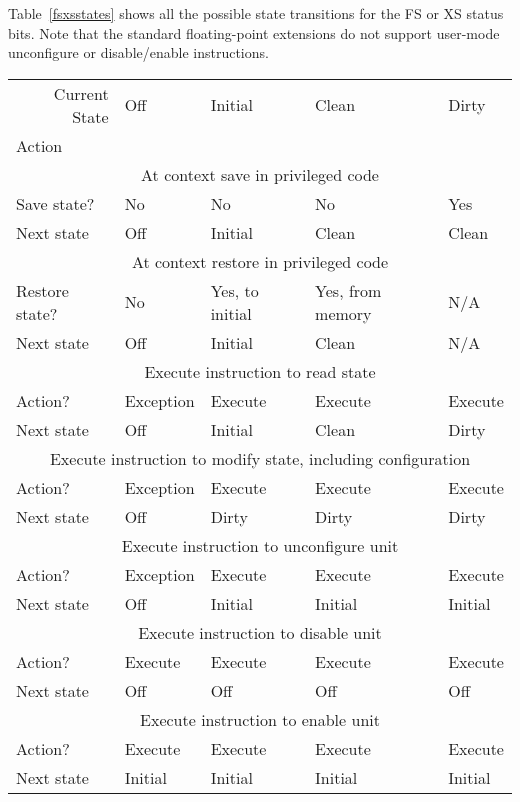 Table~\ref{fsxsstates} shows all the possible state transitions for
the FS or XS status bits.  Note that the standard floating-point
extensions do not support user-mode unconfigure or disable/enable
instructions.

\begin{table*}[h!]
\begin{center}
\begin{tabular}{|l|l|l|l|l|}
\hline
\multicolumn{1}{|r|}{Current State} & Off & Initial & Clean & Dirty \\
Action & & & &\\
\hline
\hline
\multicolumn{5}{|c|}{At context save in privileged code}\\
\hline	 
Save state?    & No         & No        & No     & Yes \\
Next state       & Off        & Initial   & Clean  & Clean \\
\hline
\hline
\multicolumn{5}{|c|}{At context restore in privileged code}\\
\hline
Restore state? & No        & Yes, to initial & Yes, from memory   & N/A \\
Next state     & Off       & Initial   & Clean  & N/A \\
\hline
\hline
\multicolumn{5}{|c|}{Execute instruction to read state}\\
\hline
Action?        & Exception & Execute   & Execute & Execute \\
Next state     & Off       & Initial   & Clean  & Dirty \\
\hline
\hline
\multicolumn{5}{|c|}{Execute instruction to modify state, including configuration}\\
\hline
Action?        & Exception & Execute & Execute & Execute \\
Next state     & Off       & Dirty   & Dirty  & Dirty \\
\hline
\hline
\multicolumn{5}{|c|}{Execute instruction to unconfigure unit}\\
\hline
Action?        & Exception & Execute & Execute & Execute \\
Next state     & Off       & Initial & Initial & Initial \\
\hline
\hline
\multicolumn{5}{|c|}{Execute instruction to disable unit}\\
\hline
Action?        & Execute   & Execute & Execute & Execute \\
Next state     & Off       & Off     & Off     & Off \\
\hline
\hline
\multicolumn{5}{|c|}{Execute instruction to enable unit}\\
\hline
Action?        & Execute   & Execute & Execute & Execute \\
Next state     & Initial   & Initial & Initial & Initial   \\
\hline
\end{tabular}
\end{center}
\caption{FS and XS state transitions.}
\label{fsxsstates}
\end{table*}

